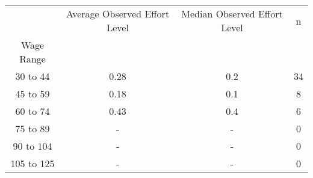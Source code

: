 \begin{tabular}{cccc}
\toprule
{} & Average Observed Effort Level & Median Observed Effort Level &   n \\
Wage Range &                               &                              &     \\
\midrule
30 to 44   &                          0.28 &                          0.2 &  34 \\
45 to 59   &                          0.18 &                          0.1 &   8 \\
60 to 74   &                          0.43 &                          0.4 &   6 \\
75 to 89   &                             - &                            - &   0 \\
90 to 104  &                             - &                            - &   0 \\
105 to 125 &                             - &                            - &   0 \\
\bottomrule
\end{tabular}
